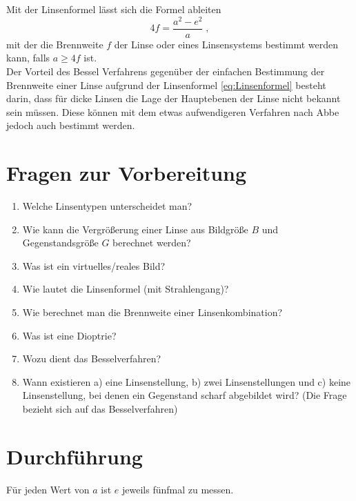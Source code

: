 \noindent
Mit der Linsenformel lässt sich die Formel ableiten
\begin{equation}
 4f = \frac{a^2 - e^2}{a}\; ,
\end{equation}
mit der die Brennweite $f$ der Linse oder eines Linsensystems bestimmt werden kann, falls $a \geq 4f$ ist.\\
Der Vorteil des Bessel Verfahrens gegenüber der einfachen Bestimmung der Brennweite einer Linse aufgrund der Linsenformel \ref{eq:Linsenformel} besteht darin, dass für dicke Linsen die Lage der Hauptebenen der Linse nicht bekannt sein müssen. Diese können mit dem etwas aufwendigeren Verfahren nach Abbe jedoch auch bestimmt werden.



\section{Fragen zur Vorbereitung}

\begin{enumerate} 
%
 \item Welche Linsentypen unterscheidet man?
%
\item Wie kann die Vergrößerung einer Linse aus Bildgröße $B$ und Gegenstandsgröße $G$ berechnet werden?
%
\item Was ist ein virtuelles/reales Bild?
%
\item Wie lautet die Linsenformel (mit Strahlengang)?
%
\item Wie berechnet man die Brennweite einer Linsenkombination?
%
\item Was ist eine Dioptrie?
%
\item Wozu dient das Besselverfahren?
%
\item Wann existieren a) eine Linsenstellung, b) zwei Linsenstellungen und c) keine Linsenstellung, bei denen ein Gegenstand scharf abgebildet wird? (Die Frage bezieht sich auf das Besselverfahren)
\end{enumerate} 

\section{Durchführung} 

Für jeden Wert von $a$ ist $e$ jeweils fünfmal zu messen.

